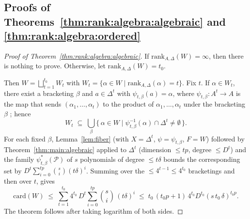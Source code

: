 \documentclass[10pt]{amsart}
\theoremstyle{definition}
\theoremstyle{remark}
\numberwithin{equation}{section}
\newcommand{\card}{\mathrm{card}}
\newcommand{\rank}{\mathrm{rank}}
\begin{document}
\subsection{Proofs of Theorems~\ref{thm:rank:algebra:algebraic} and 
\ref{thm:rank:algebra:ordered}}


\begin{proof}[Proof of Theorem~\ref{thm:rank:algebra:algebraic}]
If $\rank_{A,\Delta}(W) = \infty $, then there is nothing to prove. Otherwise, let
$\rank_{A,\Delta}(W) = t_0$.

Then $W = \bigsqcup_{t=1}^{t_0} W_t$ with
$W_t = \{\alpha \in W \mid \mathrm{rank}_{A,\Delta}(\alpha) = t\}$. Fix $t$. If
$\alpha \in W_t$, there exist a bracketing $\beta$ and
$a \in \Delta^t$ with $\psi_{t,\beta}(a) = \alpha$,
where $\psi_{t,\beta}: A^t \rightarrow A$ is the map that sends
$(\alpha_1,\ldots,\alpha_t)$ to the product of $\alpha_1,\ldots,\alpha_t$ under the bracketing $\beta$
; hence
\[
W_t \;\subseteq\; \bigcup_{\beta}
\{\,\alpha \in W \mid \psi_{t,\beta}^{-1}(\alpha) \cap \Delta^t \neq
\emptyset\,\}.
\]
For each fixed $\beta$, Lemma~\ref{lem:fiber} (with $X = \Delta^t$,
$\psi = \psi_{t,\beta}$, $F = W$) followed by Theorem~\ref{thm:main:algebraic} applied to
$\Delta^t$ (dimension $\le tp$, degree $\le D^t$) and the family $\psi_{t,\beta}^*(\mathcal{P})$ of $s$
polynomials of degree $\le t\delta$  bounds the
corresponding set by $D^t \sum_{i=0}^{tp}\binom{s}{i}(t\delta)^i$. Summing
over the $\leq 4^{t-1} \leq 4^{t_0}$ bracketings and then over $t$, gives
\[
\card(W)
\;\le\;
\sum_{t=1}^{t_0} 4^{t_0}\, D^t
\sum_{i=0}^{tp} \binom{s}{i}\,(t\delta)^i
\;\le\;
t_0\,(t_0 p + 1)\, 4^{t_0} D^{t_0} (s\, t_0\, \delta)^{t_0 p}.
\]
The theorem follows after taking logarithm of both sides.
\end{proof}
\end{document}
